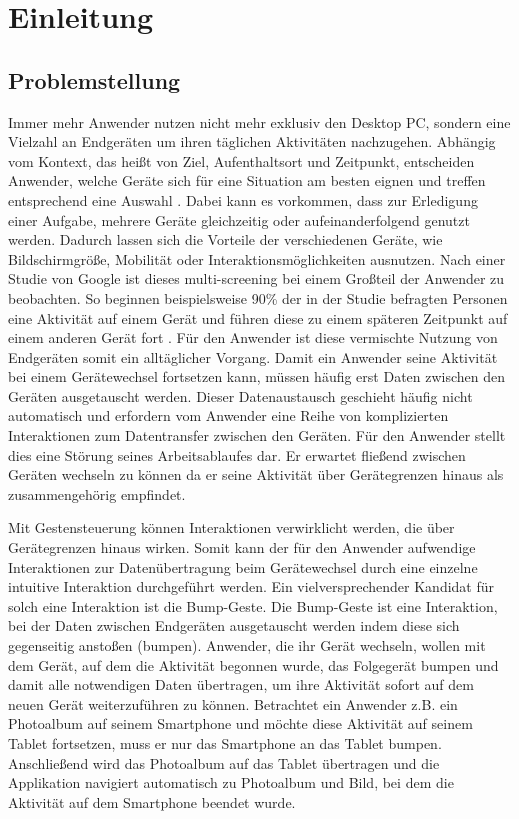  \chapter{Einleitung}
\label{Kap1}
\label{chap:Kap1}

\section{Problemstellung}
Immer mehr Anwender nutzen nicht mehr exklusiv den Desktop PC, sondern eine Vielzahl an Endgeräten um ihren täglichen Aktivitäten nachzugehen. Abhängig vom Kontext, das heißt von Ziel, Aufenthaltsort und Zeitpunkt, entscheiden Anwender, welche Geräte sich für eine Situation am besten eignen und treffen entsprechend eine Auswahl \cite{Google2014:Online}. Dabei kann es vorkommen, dass zur Erledigung einer Aufgabe, mehrere Geräte gleichzeitig oder aufeinanderfolgend genutzt werden. Dadurch lassen sich die Vorteile der verschiedenen Geräte, wie Bildschirmgröße, Mobilität oder Interaktionsmöglichkeiten ausnutzen. Nach einer Studie von Google ist dieses multi-screening bei einem Großteil der Anwender zu beobachten. So beginnen beispielsweise 90\% der in der Studie befragten Personen eine Aktivität auf einem Gerät und führen diese zu einem späteren Zeitpunkt auf einem anderen Gerät fort \cite{Google2014:Online}. Für den Anwender ist diese vermischte Nutzung von Endgeräten somit ein alltäglicher Vorgang. Damit ein Anwender seine Aktivität bei einem Gerätewechsel fortsetzen kann, müssen häufig erst Daten zwischen den Geräten ausgetauscht werden. Dieser Datenaustausch geschieht häufig nicht automatisch und erfordern vom Anwender eine Reihe von komplizierten Interaktionen zum Datentransfer zwischen den Geräten. Für den Anwender stellt dies eine Störung seines Arbeitsablaufes dar. Er erwartet fließend zwischen Geräten wechseln zu können da er seine Aktivität über Gerätegrenzen hinaus als zusammengehörig empfindet.

Mit Gestensteuerung können Interaktionen verwirklicht werden, die über Gerätegrenzen hinaus wirken. Somit kann der für den Anwender aufwendige  Interaktionen zur Datenübertragung beim Gerätewechsel durch eine einzelne intuitive Interaktion durchgeführt werden. Ein vielversprechender Kandidat für solch eine Interaktion ist die Bump-Geste. Die Bump-Geste ist eine Interaktion, bei der Daten zwischen Endgeräten ausgetauscht werden indem diese sich gegenseitig anstoßen (bumpen). Anwender, die ihr Gerät wechseln, wollen mit dem Gerät, auf dem die Aktivität begonnen wurde, das Folgegerät bumpen und damit alle notwendigen Daten übertragen, um ihre Aktivität sofort auf dem neuen Gerät weiterzuführen zu können. Betrachtet ein Anwender z.B. ein Photoalbum auf seinem Smartphone und möchte diese Aktivität auf seinem Tablet fortsetzen, muss er nur das Smartphone an das Tablet bumpen. Anschließend wird das Photoalbum auf das Tablet übertragen und die Applikation navigiert automatisch zu Photoalbum und Bild, bei dem die Aktivität auf dem Smartphone beendet wurde.

